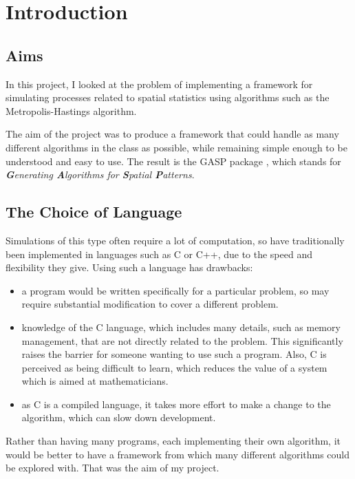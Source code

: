 
\chapter{Introduction}

\section{Aims}

In this project, I looked at the problem of implementing a framework
for simulating processes related to spatial statistics using
algorithms such as the Metropolis-Hastings algorithm.

The aim of the project was to produce a framework that could handle as
many different algorithms in the class as possible, while remaining
simple enough to be understood and easy to use.  The result is the
GASP package \cite{gasp-source}, which stands for
\emph{\textbf{G}enerating \textbf{A}lgorithms for \textbf{S}patial
\textbf{P}atterns}.

\section{The Choice of Language}

Simulations of this type often require a lot of computation, so have
traditionally been implemented in languages such as C or C++, due to
the speed and flexibility they give.  Using such a language has
drawbacks:

\begin{itemize}
\item a program would be written specifically for a particular
problem, so may require substantial modification to cover a different
problem.
\item knowledge of the C language, which includes many details, such
as memory management, that are not directly related to the problem.
This significantly raises the barrier for someone wanting to use such
a program.  Also, C is perceived as being difficult to learn, which
reduces the value of a system which is aimed at mathematicians.
\item as C is a compiled language, it takes more effort to make a
change to the algorithm, which can slow down development.
\end{itemize}

Rather than having many programs, each implementing their own
algorithm, it would be better to have a framework from which many
different algorithms could be explored with.  That was the aim of
my project.

